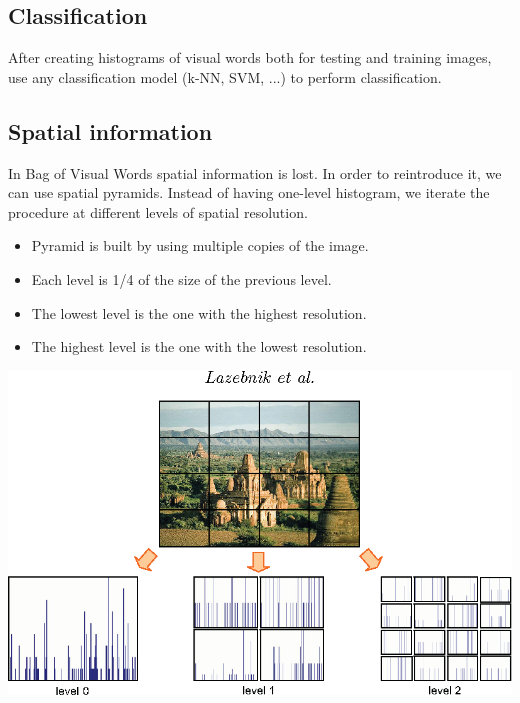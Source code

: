 \subsection{Classification}
After creating histograms of visual words both for testing and training images, use any classification model (k-NN, SVM, ...) to perform classification. 

\subsection{Spatial information}
In Bag of Visual Words spatial information is lost. In order to reintroduce it, we can use spatial pyramids. Instead of having one-level histogram, we iterate the procedure at different levels of spatial resolution.
\begin{itemize}
    \item Pyramid is built by using multiple copies of the image.
    \item Each level is 1/4 of the size of the previous level.
    \item The lowest level is the one with the highest resolution.
    \item The highest level is the one with the lowest resolution.
\end{itemize}
\begin{center}
    \includegraphics[scale = 0.4]{images/Spatial pyramids.png}
\end{center}

